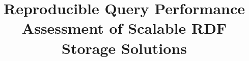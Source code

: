\documentclass[twocolumn]{bmcart}%
\begin{document}
\begin{frontmatter}

\begin{fmbox}


\title{Reproducible Query Performance Assessment of Scalable RDF Storage Solutions}


\author[
   addressref={A},                   %
   email={drdwitte@gmail.com}   %
]{ }
\author[
addressref={A},                   %
]{ }
\author[
addressref={A},
]{ }
\author[
addressref={B},
]{ }
\author[
addressref={B},
]{ }
\author[
addressref={B},
]{ }
\author[
addressref={A},
]{ }
\author[
addressref={A},
]{ }
\author[
addressref={A},
]{ }




\end{fmbox}
\end{frontmatter}
\end{document}
